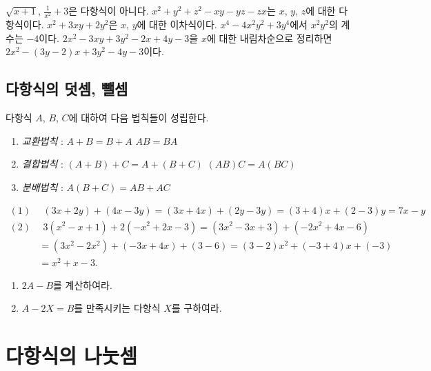 \documentclass{oblivoir}
\begin{document}
%
\label{poly2}
\vspace{-20pt}
\tabd
{\(\sqrt{x+1}\), \(\frac1{x^2}+3\)은 다항식이 아니다.}
{\(x^2+y^2+z^2-xy-yz-zx\)는 \(x\), \(y\), \(z\)에 대한 다항식이다.}
{\(x^2+3xy+2y^2\)은 \(x\), \(y\)에 대한 이차식이다.}
{\(x^4-4x^2y^2+3y^4\)에서 \(x^2y^2\)의 계수는 \(-4\)이다.}
{\(2x^2-3xy+3y^2-2x+4y-3\)을 \(x\)에 대한 내림차순으로 정리하면\\ \(2x^2-(3y-2)x+3y^2-4y-3\)이다.}

\clearpage
\subsection{다항식의 덧셈, 뺄셈}

다항식 \(A\), \(B\), \(C\)에 대하여 다음 법칙들이 성립한다.
\begin{mdframed}
%
\begin{enumerate}
\item
\emph{교환법칙} : \(A+B=B+A\)			\(AB=BA\)
\item
\emph{결합법칙} : \((A+B)+C=A+(B+C)\)	\((AB)C=A(BC)\)
\item
\emph{분배법칙} : \(A(B+C)=AB+AC\)		
\end{enumerate}
\end{mdframed}

%
\exam{}
\vspace{-25pt}
\begin{align*}
(1)&\:\:
(3x+2y)+(4x-3y)
=(3x+4x)+(2y-3y)
=(3+4)x+(2-3)y=7x-y\\
(2)&\:\:
3(x^2-x+1)+2(-x^2+2x-3)
=(3x^2-3x+3)+(-2x^2+4x-6)\\
&=(3x^2-2x^2)+(-3x+4x)+(3-6)
=(3-2)x^2+(-3+4)x+(-3)\\
&=x^2+x-3.
\end{align*}

%
\begin{enumerate}\label{poly3}
\item
\(2A-B\)를 계산하여라.
\item
\(A-2X=B\)를 만족시키는 다항식 \(X\)를 구하여라.
\end{enumerate}

\section{다항식의 나눗셈}
\end{document}
